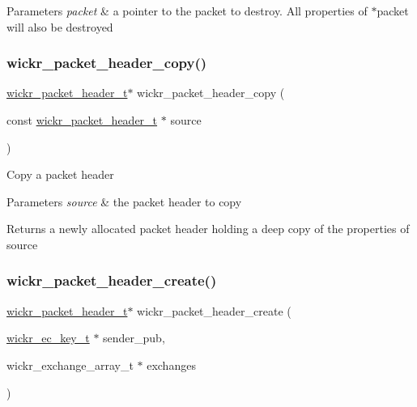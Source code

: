 \begin{DoxyParams}{Parameters}
{\em packet} & a pointer to the packet to destroy. All properties of \textquotesingle{}$\ast$packet\textquotesingle{} will also be destroyed \\
\hline
\end{DoxyParams}
\mbox{\label{group__wickr__protocol_ga5ffb8763c9ebf2ad7322d507d117d7ba}} 
\subsubsection{\texorpdfstring{wickr\+\_\+packet\+\_\+header\+\_\+copy()}{wickr\_packet\_header\_copy()}}
{\footnotesize\ttfamily \hyperlink{structwickr__packet__header}{wickr\+\_\+packet\+\_\+header\+\_\+t}$\ast$ wickr\+\_\+packet\+\_\+header\+\_\+copy (\begin{DoxyParamCaption}\item[{const \hyperlink{structwickr__packet__header}{wickr\+\_\+packet\+\_\+header\+\_\+t} $\ast$}]{source }\end{DoxyParamCaption})}

Copy a packet header


\begin{DoxyParams}{Parameters}
{\em source} & the packet header to copy \\
\hline
\end{DoxyParams}
\begin{DoxyReturn}{Returns}
a newly allocated packet header holding a deep copy of the properties of \textquotesingle{}source\textquotesingle{} 
\end{DoxyReturn}
\mbox{\label{group__wickr__protocol_ga8ad519d1b5dc3960c426db9a556404e1}} 
\subsubsection{\texorpdfstring{wickr\+\_\+packet\+\_\+header\+\_\+create()}{wickr\_packet\_header\_create()}}
{\footnotesize\ttfamily \hyperlink{structwickr__packet__header}{wickr\+\_\+packet\+\_\+header\+\_\+t}$\ast$ wickr\+\_\+packet\+\_\+header\+\_\+create (\begin{DoxyParamCaption}\item[{\hyperlink{structwickr__ec__key}{wickr\+\_\+ec\+\_\+key\+\_\+t} $\ast$}]{sender\+\_\+pub,  }\item[{wickr\+\_\+exchange\+\_\+array\+\_\+t $\ast$}]{exchanges }\end{DoxyParamCaption})}

